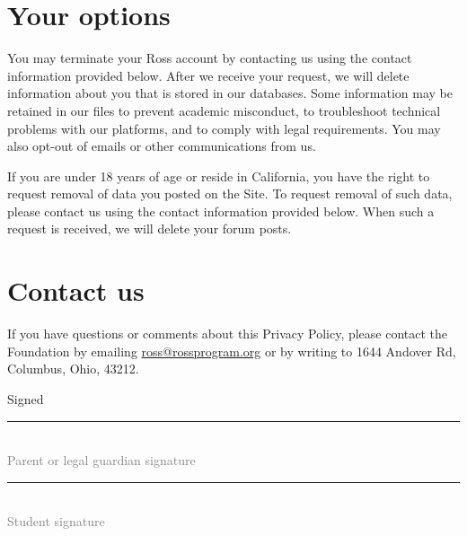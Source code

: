 \documentclass{ross}
\begin{document}
\section{Your options}

You may terminate your Ross account by contacting us using the contact
information provided below.  After we receive your request, we will
delete information about you that is stored in our databases.  Some
information may be retained in our files to prevent academic
misconduct, to troubleshoot technical problems with our platforms, and
to comply with legal requirements.  You may also opt-out of emails or
other communications from us.

If you are under 18 years of age or reside in California, you have the
right to request removal of data you posted on the Site. To request
removal of such data, please contact us using the contact information
provided below. When such a request is received, we will delete your forum posts.

\section{Contact us}

If you have questions or comments about this Privacy Policy, please
contact the Foundation by emailing \url{ross@rossprogram.org} or by
writing to 1644 Andover Rd, Columbus, Ohio, 43212.

\vspace{0.5in}
\hfill Signed \rule{3in}{0.1mm}\\[-1.5mm]
\hspace*{3.7in} {\footnotesize \textcolor{gray}{Parent or legal guardian signature} }


\vspace{0.5in}

\hfill  \rule{3in}{0.1mm}\\[-1.5mm]
\hspace*{3.7in} {\footnotesize \textcolor{gray}{Student signature} }


\end{document}

